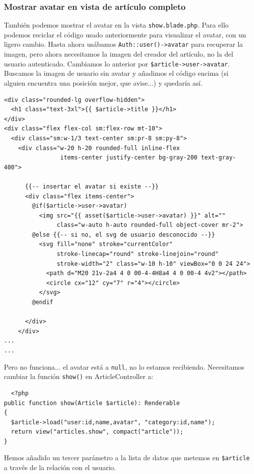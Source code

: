 \documentclass[11pt]{article}
\begin{document}
\subsubsection{Mostrar avatar en vista de artículo completo}
\label{sec:org8c3669c}
También podemos mostrar el avatar en la vista \texttt{show.blade.php}. Para
ello podemos reciclar el código usado anteriormente para visualizar el
avatar, con un ligero cambio. Hasta ahora usábamos
\texttt{Auth::user()->avatar} para recuperar la imagen, pero ahora
necesitamos la imagen del creador del artículo, no la del usuario
autenticado. Cambiamos lo anterior por
\texttt{\$article->user->avatar}. Buscamos la imagen de usuario sin avatar y
añadimos el código encima (si alguien encuentra una posición mejor,
que avise...) y quedaría así.
\begin{verbatim}
<div class="rounded-lg overflow-hidden">
  <h1 class="text-3xl">{{ $article->title }}</h1>
</div>
<div class="flex flex-col sm:flex-row mt-10">
  <div class="sm:w-1/3 text-center sm:pr-8 sm:py-8">
    <div class="w-20 h-20 rounded-full inline-flex
                items-center justify-center bg-gray-200 text-gray-400">

      {{-- insertar el avatar si existe --}}
      <div class="flex items-center">
        @if($article->user->avatar)
          <img src="{{ asset($article->user->avatar) }}" alt=""
               class="w-auto h-auto rounded-full object-cover mr-2">
        @else {{-- si no, el svg de usuario desconocido --}}
          <svg fill="none" stroke="currentColor"
               stroke-linecap="round" stroke-linejoin="round"
               stroke-width="2" class="w-10 h-10" viewBox="0 0 24 24">
            <path d="M20 21v-2a4 4 0 00-4-4H8a4 4 0 00-4 4v2"></path>
            <circle cx="12" cy="7" r="4"></circle>
          </svg>
        @endif

      </div>
    </div>
...
...
\end{verbatim}

Pero no funciona... el avatar está a \texttt{null}, no lo estamos
recibiendo. Necesitamos cambiar la función \texttt{show()} en
ArticleController a:
\begin{verbatim}
  <?php
public function show(Article $article): Renderable
{
  $article->load("user:id,name,avatar", "category:id,name");
  return view("articles.show", compact("article"));
}
\end{verbatim}

Hemos añadido un tercer parámetro a la lista de datos que metemos en
\texttt{\$article} a través de la relación con el usuario.
\end{document}
